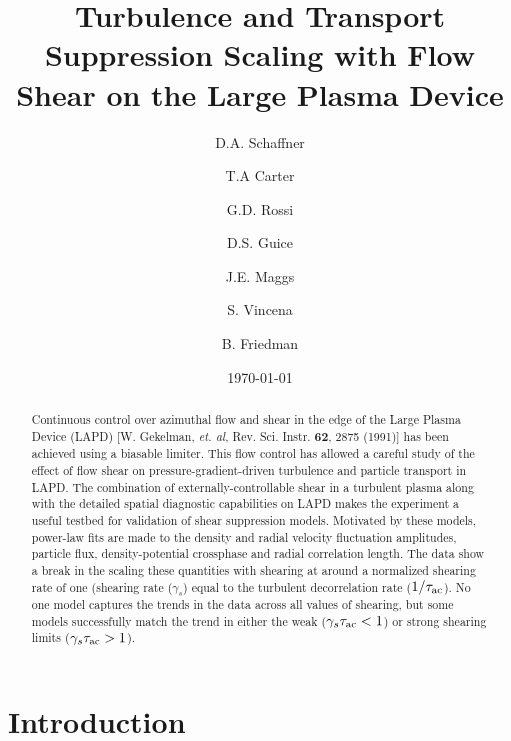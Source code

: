 \documentclass[aip,pop,amsmath,amssymb,reprint,superscriptaddress]{revtex4-1} %
\begin{document}
\title{Turbulence and Transport Suppression Scaling with Flow Shear on the Large Plasma Device}
\author{D.A. Schaffner}
\author{T.A Carter}
\author{G.D. Rossi}
\author{D.S. Guice}
\author{J.E. Maggs}
\author{S. Vincena}
\author{B. Friedman}
\date{\today}
\begin{abstract}
Continuous control over azimuthal flow and shear in the edge of the Large Plasma Device (LAPD) [W. Gekelman, \textit{et. al}, Rev. Sci. Instr. \textbf{62}, 2875 (1991)] has been achieved using a biasable limiter.  This flow control has allowed a careful study of the effect of flow shear on pressure-gradient-driven turbulence and particle transport in LAPD. The combination of externally-controllable shear in a turbulent plasma along with the detailed spatial diagnostic capabilities on LAPD makes the experiment a useful testbed for validation of shear suppression models. Motivated by these models, power-law fits are made to the density and radial velocity fluctuation amplitudes, particle flux, density-potential crossphase and radial correlation length.  The data show a break in the scaling these quantities with shearing at around a normalized shearing rate of one (shearing rate ($\gamma_s$) equal to the turbulent decorrelation rate ($1/\tau_{\rm ac}$).  No one model captures the trends in the data across all values of shearing, but some models successfully match the trend in either the weak  ($\gamma_s \tau_{\rm ac} < 1$) or strong shearing limits ($\gamma_s \tau_{\rm ac} > 1$). 
\end{abstract}
\maketitle

\section{Introduction}
\end{document}
